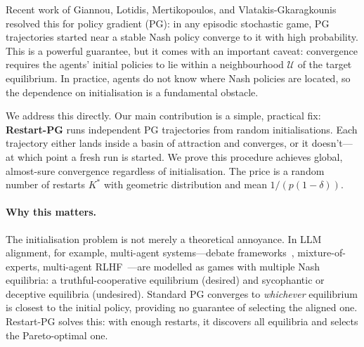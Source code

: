 \documentclass{article}
\begin{document}
Recent work of Giannou, Lotidis, Mertikopoulos, and
Vlatakis-Gkaragkounis~\cite{giannou2022} resolved this for policy
gradient (PG): in any episodic stochastic game, PG trajectories
started near a stable Nash policy converge to it with high probability.
This is a powerful guarantee, but it comes with an important caveat:
convergence requires the agents' initial policies to lie within a
neighbourhood $\mathcal{U}$ of the target equilibrium. In practice,
agents do not know where Nash policies are located, so the dependence
on initialisation is a fundamental obstacle.

We address this directly. Our main contribution is a simple, practical
fix: \textbf{Restart-PG} runs independent PG trajectories from random
initialisations. Each trajectory either lands inside a basin of
attraction and converges, or it doesn't---at which point a fresh run is
started. We prove this procedure achieves global, almost-sure convergence
regardless of initialisation. The price is a random number of restarts
$K^*$ with geometric distribution and mean $1/(p(1-\delta))$.

\paragraph{Why this matters.} The initialisation problem is not
merely a theoretical annoyance. In LLM alignment, for example,
multi-agent systems---debate frameworks~\cite{irving2018debate},
mixture-of-experts, multi-agent RLHF~\cite{munos2024nash}---are modelled
as games with multiple Nash equilibria: a truthful-cooperative
equilibrium (desired) and sycophantic or deceptive equilibria
(undesired). Standard PG converges to \emph{whichever} equilibrium
is closest to the initial policy, providing no guarantee of selecting
the aligned one. Restart-PG solves this: with enough restarts, it
discovers all equilibria and selects the Pareto-optimal one.
\end{document}
